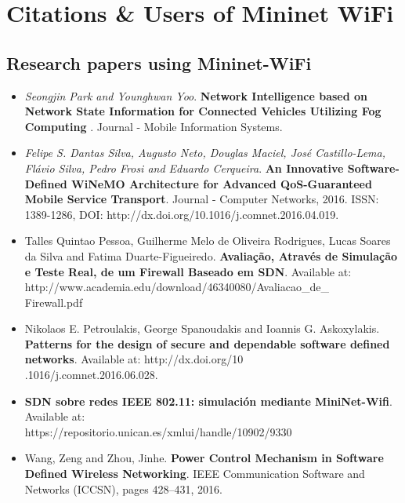 \chapter{Citations \& Users of Mininet WiFi}

\section{Research papers using Mininet-WiFi}

\begin{itemize}
\item \textit{Seongjin Park and Younghwan Yoo}. \textbf{Network Intelligence based on Network State Information for Connected Vehicles Utilizing Fog Computing
}. Journal - Mobile Information Systems.
\\
\item \textit{Felipe S. Dantas Silva, Augusto Neto, Douglas Maciel, José Castillo-Lema, Flávio Silva, Pedro Frosi and Eduardo Cerqueira}. \textbf{An Innovative Software-Defined WiNeMO Architecture for Advanced QoS-Guaranteed Mobile Service Transport}. Journal - Computer Networks, 2016. ISSN: 1389-1286, DOI: http://dx.doi.org/10.1016/j.comnet.2016.04.019.
\\
\item Talles Quintao Pessoa, Guilherme Melo de Oliveira Rodrigues, Lucas Soares da Silva and Fatima Duarte-Figueiredo. \textbf{Avaliação, Através de Simulação e Teste Real, de um Firewall Baseado em SDN}. Available at: http://www.academia.edu/download/46340080/Avaliacao\_de\_\\Firewall.pdf
\\
\item Nikolaos E. Petroulakis, George Spanoudakis and Ioannis G. Askoxylakis. \textbf{Patterns for the design of secure and dependable software defined networks}. Available at: http://dx.doi.org/10\\.1016/j.comnet.2016.06.028.
\\
\item \textbf{SDN sobre redes IEEE 802.11: simulación mediante MiniNet-Wifi}. Available at:\\ https://repositorio.unican.es/xmlui/handle/10902/9330
\\
\item Wang, Zeng and Zhou, Jinhe. \textbf{Power Control Mechanism in Software Defined Wireless Networking}. IEEE Communication Software and Networks (ICCSN), pages 428--431, 2016.\\


\end{itemize}

